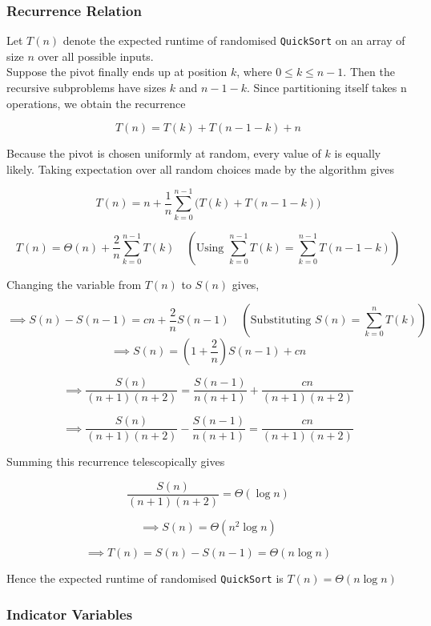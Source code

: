 \documentclass[11pt,openany]{book}
\begin{document}
\subsubsection*{Recurrence Relation}
Let \(T(n)\) denote the expected runtime of randomised \texttt{QuickSort} on 
an array of size \(n\) over all possible inputs.\\


\noindent Suppose the pivot finally ends up at position \(k\), where \(0\le k\le n-1\). Then the recursive subproblems have sizes \(k\) and \(n-1-k\). Since partitioning itself takes n operations, we obtain the recurrence

\[
T(n)
=
T(k)+T(n-1-k)+n
\]

\noindent Because the pivot is chosen uniformly at random, every value of \(k\) is equally likely. Taking expectation over all random choices made by the algorithm gives

\[
T(n)
=
n
+
\frac{1}{n}\sum_{k=0}^{n-1}
\Big(
T(k)+T(n-1-k)
\Big)
\]

\[
T(n)
=
\Theta(n)
+
\frac{2}{n}\sum_{k=0}^{n-1}T(k)
\quad
(\text{Using } \sum_{k=0}^{n-1}T(k)
=
\sum_{k=0}^{n-1}T(n-1-k))
\]

\noindent Changing the variable from $T(n)$ to $S(n)$ gives,

\[
\implies
S(n)-S(n-1)
=
cn+\frac{2}{n}S(n-1)
\quad (\text{Substituting } S(n)=\sum_{k=0}^{n}T(k))
\]
\[
\implies
S(n)
=
\left(1+\frac{2}{n}\right)S(n-1)+cn
\]

\[
\implies
\frac{S(n)}{(n+1)(n+2)}
=
\frac{S(n-1)}{n(n+1)}
+
\frac{cn}{(n+1)(n+2)}
\]

\[
\implies
\frac{S(n)}{(n+1)(n+2)}
-
\frac{S(n-1)}{n(n+1)}
=
\frac{cn}{(n+1)(n+2)}
\]

\vspace{0.3mm}
Summing this recurrence telescopically gives

\[
\frac{S(n)}{(n+1)(n+2)}
=
\Theta(\log n)
\]


\[
\implies
S(n)=\Theta(n^2\log n)
\]


\[
\implies
T(n)
=
S(n)-S(n-1)
=
\Theta(n\log n)
\]

Hence the expected runtime of randomised \texttt{QuickSort} is $
T(n)=\Theta(n\log n)$\\

\subsubsection*{Indicator Variables}
\end{document}
